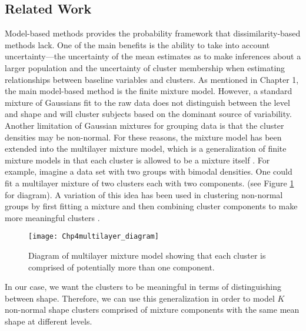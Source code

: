 \documentclass[12pt]{article}
\begin{document}
\subsection{Related Work}
Model-based methods provides the probability framework that dissimilarity-based methods lack. One of the main benefits is the ability to take into account uncertainty---the uncertainty of the mean estimates as to make inferences about a larger population and the uncertainty of cluster membership when estimating relationships between baseline variables and clusters. As mentioned in Chapter 1, the main model-based method is the finite mixture model. However, a standard mixture of Gaussians fit to the raw data does not distinguish between the level and shape and will cluster subjects based on the dominant source of variability. Another limitation of Gaussian mixtures for grouping data is that the cluster densities may be non-normal. For these reasons, the mixture model has been extended into the multilayer mixture model, which is a generalization of finite mixture models in that each cluster is allowed to be a mixture itself \cite{li2005}. For example, imagine a data set with two groups with bimodal densities. One could fit a multilayer mixture of two clusters each with two components. (see Figure \ref{fig:dia} for diagram). A variation of this idea has been used in clustering non-normal groups by first fitting a mixture and then combining cluster components to make more meaningful clusters \cite{hennig2010}. 
\begin{figure}[h]
\begin{center}
\texttt{[image: Chp4multilayer\_diagram]}
\end{center}
\label{fig:dia}
\caption{Diagram of multilayer mixture model showing that each cluster is comprised of potentially more than one component.}
\end{figure}

In our case, we want the clusters to be meaningful in terms of distinguishing between shape. Therefore, we can use this generalization in order to model $K$ non-normal shape clusters comprised of mixture components with the same mean shape at different levels.
\end{document}
